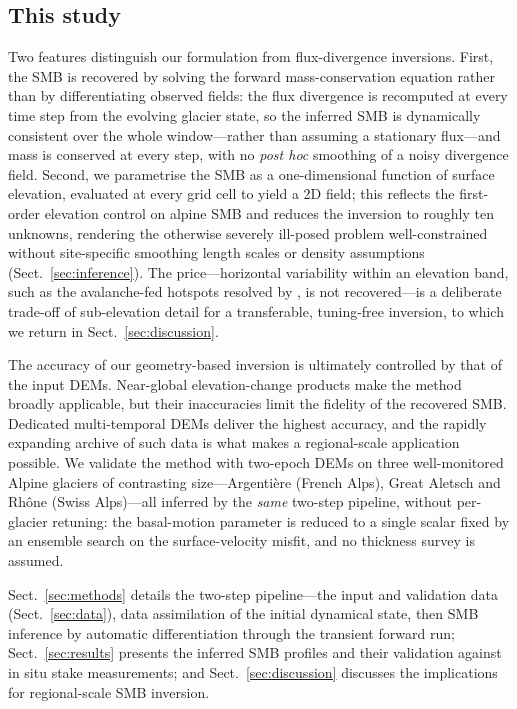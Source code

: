 \subsection{This study}\label{sec:contribution}
Two features distinguish our formulation from flux-divergence inversions. First, the SMB is recovered by solving the forward mass-conservation equation rather than by differentiating observed fields: the flux divergence is recomputed at every time step from the evolving glacier state, so the inferred SMB is dynamically
consistent over the whole window---rather than assuming a stationary flux---and mass is conserved at every step, with no \emph{post hoc} smoothing of a noisy divergence field. Second, we parametrise the SMB as a one-dimensional function of surface elevation, evaluated at every grid cell to yield a 2D field; this reflects the first-order elevation control on alpine SMB and reduces the inversion to roughly ten unknowns, rendering the otherwise severely ill-posed problem well-constrained without site-specific smoothing length scales or density assumptions (Sect.~\ref{sec:inference}). The price---horizontal variability within an elevation band, such as the avalanche-fed hotspots resolved by \citet{kneib2024}, is not recovered---is a deliberate trade-off of sub-elevation detail for a transferable, tuning-free inversion, to which we return in Sect.~\ref{sec:discussion}.

The accuracy of our geometry-based inversion is ultimately controlled by that of the input DEMs. Near-global elevation-change products \citep{hugonnet2021} make the method broadly applicable, but their inaccuracies limit the fidelity of the recovered SMB. Dedicated multi-temporal DEMs deliver the highest accuracy, and the rapidly expanding archive of such data is what makes a regional-scale application possible. We validate the method with two-epoch DEMs on three well-monitored Alpine glaciers of contrasting size---Argentière (French Alps), Great Aletsch and Rhône (Swiss Alps)---all inferred by the \emph{same} two-step pipeline, without per-glacier retuning: the basal-motion parameter is reduced to a single scalar fixed by an ensemble search on the surface-velocity misfit, and no thickness survey is assumed.

Sect.~\ref{sec:methods} details the two-step pipeline---the input and validation data (Sect.~\ref{sec:data}), data assimilation of the initial dynamical state, then SMB inference by
automatic differentiation through the transient forward run; Sect.~\ref{sec:results} presents the inferred SMB profiles and their validation against in situ stake measurements; and Sect.~\ref{sec:discussion} discusses the implications for regional-scale SMB inversion.

